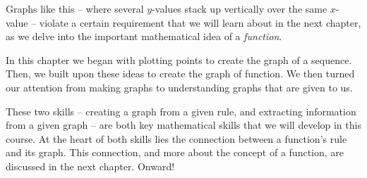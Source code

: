 Graphs like this -- where several $y$-values stack up vertically over the same $x$-value -- violate a certain requirement that we will learn about in the next chapter, as we delve into the important mathematical idea of a \textit{function}.

\chaptersummary

In this chapter we began with plotting points to create the graph of a sequence. Then, we built upon these ideas to create the graph of function. We then turned our attention from making graphs to understanding graphs that are given to us.

These two skills -- creating a graph from a given rule, and extracting information from a given graph -- are both key mathematical skills that we will develop in this course. At the heart of both skills lies the connection between a function's rule and its graph. This connection, and more about the concept of a function, are discussed in the next chapter. Onward!

\chaptercopyright
